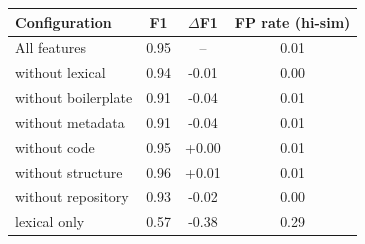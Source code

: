 \begin{tabular}{lccc}
\toprule
Configuration & F1 & $\Delta$F1 & FP rate (hi-sim) \\
\midrule
All features & 0.95 & -- & 0.01 \\
without lexical & 0.94 & -0.01 & 0.00 \\
without boilerplate & 0.91 & -0.04 & 0.01 \\
without metadata & 0.91 & -0.04 & 0.01 \\
without code & 0.95 & +0.00 & 0.01 \\
without structure & 0.96 & +0.01 & 0.01 \\
without repository & 0.93 & -0.02 & 0.00 \\
lexical only & 0.57 & -0.38 & 0.29 \\
\bottomrule
\end{tabular}
